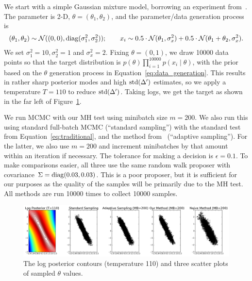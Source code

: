 \documentclass{article}
\begin{document}
We start with a simple Gaussian mixture model, borrowing an experiment from~\cite{langevin_2011}.
The parameter is 2-D, $\theta = (\theta_1,\theta_2)$, and the parameter/data generation process is
\begin{equation}\label{eq:data_generation}
(\theta_1,\theta_2) \sim \mathcal{N}((0,0), {\rm diag}(\sigma_1^2, \sigma_2^2));\quad \quad x_i \sim
0.5 \cdot \mathcal{N}(\theta_1, \sigma_x^2) + 0.5 \cdot \mathcal{N}(\theta_1+\theta_2, \sigma_x^2).
\end{equation}
We set $\sigma_1^2 = 10, \sigma_2^2 = 1$ and $\sigma_x^2=2$. Fixing $\theta = (0,1)$, we draw 10000
data points so that the target distribution is $p(\theta)\prod_{i=1}^{10000}p(x_i\mid \theta)$, with
the prior based on the $\theta$ generation process in Equation~\ref{eq:data_generation}. This
results in rather sharp posterior modes and high ${\rm std}(\Delta')$ estimates, so we apply a
temperature $T=110$ to reduce ${\rm std}(\Delta')$. Taking logs, we get the target as shown in the
far left of Figure~\ref{fig:gauss_mix_1}.

We run MCMC with our MH test using minibatch size $m=200$. We also run this using standard
full-batch MCMC (``standard sampling'') with the standard test from Equation~\ref{eq:traditional}, and the method
from~\cite{cutting_mh_2014} (``adaptive sampling''). For the latter, we also use $m=200$ and
increment minibatches by that amount within an iteration if necessary. The tolerance for making a
decision is $\epsilon=0.1$. To make comparisons easier, all three use the same random walk proposer
with covariance $\Sigma={\rm diag}(0.03, 0.03)$. This is a poor proposer, but it is sufficient for
our purposes as the quality of the samples will be primarily due to the MH test. All methods are run
10000 times to collect 10000 samples.

\begin{figure}[t]
    \centering
    \includegraphics[width=1\linewidth]{cloud_v01.png}
    \caption{
    The log posterior contours (temperature 110) and three scatter plots of sampled $\theta$ values.
    }
    \label{fig:gauss_mix_1}
\end{figure}
\end{document}
